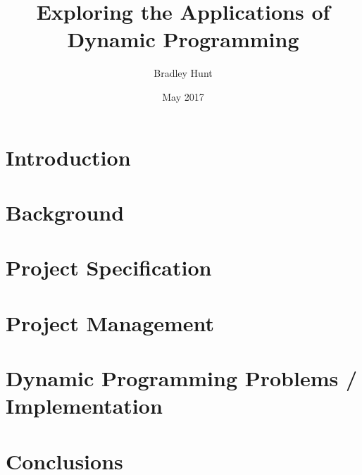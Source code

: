 \documentclass[11pt]{report}
\title{
	{Exploring the Applications of Dynamic Programming}
}
\author{Bradley Hunt}
\date{May 2017}
\begin{document}
\maketitle

\tableofcontents
\newpage
\chapter{Introduction}


\chapter{Background}


\chapter{Project Specification}


\chapter{Project Management}


\chapter{Dynamic Programming Problems / Implementation}


\chapter{Conclusions}


\printbibliography
\end{document}
